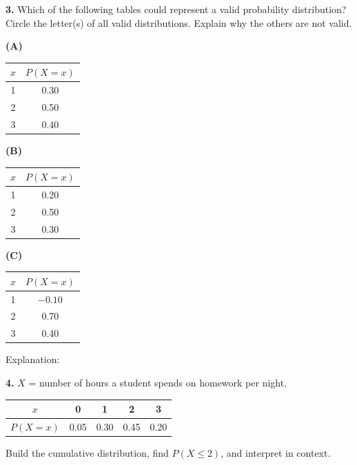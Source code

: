 \documentclass[10pt]{article}
\begin{document}
\begin{practicebox}
\vspace{0.14in}

\textbf{3.} Which of the following tables could represent a valid probability distribution?
Circle the letter(s) of all valid distributions. Explain why the others are not valid.

\vspace{6pt}
\begin{minipage}[t]{0.3\linewidth}
\textbf{(A)}
\begin{tabular}{@{}cc@{}}
$x$ & $P(X=x)$ \\
\hline
1 & 0.30 \\
2 & 0.50 \\
3 & 0.40 \\
\end{tabular}
\end{minipage}
\hfill
\begin{minipage}[t]{0.3\linewidth}
\textbf{(B)}
\begin{tabular}{@{}cc@{}}
$x$ & $P(X=x)$ \\
\hline
1 & 0.20 \\
2 & 0.50 \\
3 & 0.30 \\
\end{tabular}
\end{minipage}
\hfill
\begin{minipage}[t]{0.3\linewidth}
\textbf{(C)}
\begin{tabular}{@{}cc@{}}
$x$ & $P(X=x)$ \\
\hline
1 & $-0.10$ \\
2 & 0.70 \\
3 & 0.40 \\
\end{tabular}
\end{minipage}

\vspace{8pt}
Explanation: \writeline\\[1pt]\writeline

\vspace{0.14in}

\textbf{4.} $X$ = number of hours a student spends on homework per night.
\begin{center}
\renewcommand{\arraystretch}{1.4}
\begin{tabular}{@{}ccccc@{}}
$x$ & 0 & 1 & 2 & 3 \\
\hline
$P(X=x)$ & 0.05 & 0.30 & 0.45 & 0.20 \\
\end{tabular}
\end{center}
Build the cumulative distribution, find $P(X \le 2)$, and interpret in context.


\end{practicebox}
\end{document}
